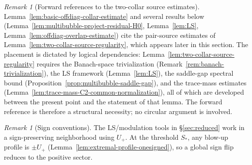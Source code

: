 \documentclass[11pt,reqno,a4paper]{amsart}
\numberwithin{equation}{section}
\theoremstyle{plain}
\theoremstyle{remark}
\newtheorem{remark}[theorem]{Remark}
\theoremstyle{plain}
\begin{document}
\begin{remark}[Forward references to the two-collar source estimates]
\label{rem:two-collar-forward-reference}
Lemma~\ref{lem:basic-offdiag-collar-estimate} and several results below
(Lemma~\ref{lem:multibubble-project-residual-H0},
Lemma~\ref{lem:LS},
Lemma~\ref{lem:offdiag-overlap-estimate})
cite the pair-source estimates of Lemma~\ref{lem:two-collar-source-regularity},
which appears later in this section.  The placement is dictated by logical
dependencies: Lemma~\ref{lem:two-collar-source-regularity} requires the
Banach-space trivialization (Remark~\ref{rem:banach-trivialization}), the LS
framework (Lemma~\ref{lem:LS}), the saddle-gap spectral bound
(Proposition~\ref{prop:multibubble-saddle-gap}), and the trace-mass estimates
(Lemma~\ref{lem:trace-mass-C2-common-normalization}), all of which are developed
between the present point and the statement of that lemma.  The forward reference
is therefore a structural necessity; no circular argument is involved.
\end{remark}


\begin{remark}[Sign conventions]\label{rem:sign-scope-escIII}
The LS/modulation tools in \S\ref{sec:reduced} work in a sign-preserving neighborhood using $U_+$.
At the threshold $S_\ast$, any blow-up profile is $\pm U_+$ (Lemma~\ref{lem:extremal-profile-onesigned}),
so a global sign flip reduces to the positive sector.
\end{remark}
\end{document}
